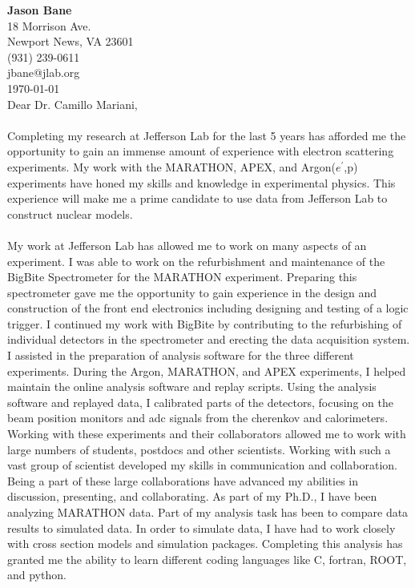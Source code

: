 \documentclass[12pt,letterpaper]{article}
\newcommand{\CPP}
{C\nolinebreak[4]\hspace{-.05em}\raisebox{.22ex}{\footnotesize\bf ++}}
\begin{document}
\vspace*{-1.2cm}
{\textbf{Jason Bane}}\\
18 Morrison Ave. \\
Newport News, VA 23601 \\
(931) 239-0611 \\
jbane@jlab.org \\
\today\\

Dear Dr. Camillo Mariani, 

\paragraph{}Completing my research at Jefferson Lab for the last 5 years has afforded me the opportunity to gain an immense amount of experience with electron scattering experiments. My work with the MARATHON, APEX, and Argon($e^\prime$,p) experiments have honed my skills and knowledge in experimental physics. This experience will make me a prime candidate to use data from Jefferson Lab to construct nuclear models. 
\paragraph{}My work at Jefferson Lab has allowed me to work on many aspects of an experiment. I was able to work on the refurbishment and maintenance of the BigBite Spectrometer for the MARATHON experiment. Preparing this spectrometer gave me the opportunity to gain experience in the design and construction of the front end electronics including designing and testing of a logic trigger. I continued my work with BigBite by contributing to the refurbishing of individual detectors in the spectrometer and erecting the data acquisition system. I assisted in the preparation of analysis software for the three different experiments. During the Argon, MARATHON, and APEX experiments, I helped maintain the online analysis software and replay scripts. Using the analysis software and replayed data, I calibrated parts of the detectors, focusing on the beam position monitors and adc signals from the cherenkov and calorimeters. Working with these experiments and their collaborators allowed me to work with large numbers of students, postdocs and other scientists.  Working with such a vast group of scientist developed my skills in communication and collaboration. Being a part of these large collaborations have advanced my abilities in discussion, presenting, and collaborating.
As part of my Ph.D., I have been analyzing MARATHON data. Part of my analysis task has been to compare data results to simulated data. In order to simulate data, I have had to work closely with cross section models and simulation packages. Completing this analysis has granted me the ability to learn different coding languages like \CPP, fortran, ROOT, and python.
\end{document}
